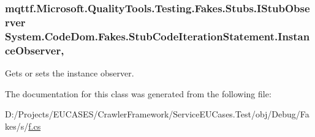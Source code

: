 \hypertarget{class_system_1_1_code_dom_1_1_fakes_1_1_stub_code_iteration_statement_acad0b23176021aa30cec17db25173e84}{
\subsubsection[{Instance\-Observer}]{\setlength{\rightskip}{0pt plus 5cm}mqttf.\-Microsoft.\-Quality\-Tools.\-Testing.\-Fakes.\-Stubs.\-I\-Stub\-Observer System.\-Code\-Dom.\-Fakes.\-Stub\-Code\-Iteration\-Statement.\-Instance\-Observer\hspace{0.3cm}{\ttfamily [get]}, {\ttfamily [set]}}}\label{class_system_1_1_code_dom_1_1_fakes_1_1_stub_code_iteration_statement_acad0b23176021aa30cec17db25173e84}


Gets or sets the instance observer.



The documentation for this class was generated from the following file\-:\begin{DoxyCompactItemize}
\item 
D\-:/\-Projects/\-E\-U\-C\-A\-S\-E\-S/\-Crawler\-Framework/\-Service\-E\-U\-Cases.\-Test/obj/\-Debug/\-Fakes/s/\hyperlink{s_2f_8cs}{f.\-cs}\end{DoxyCompactItemize}
